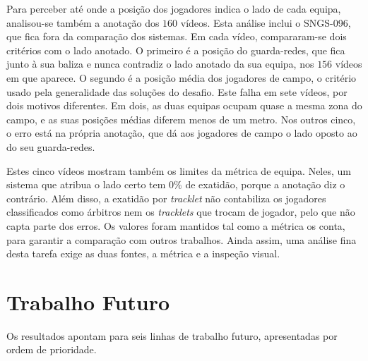 Para perceber até onde a posição dos jogadores indica o lado de cada equipa, analisou-se também a anotação dos $160$ vídeos. Esta análise inclui o SNGS-096, que fica fora da comparação dos sistemas. Em cada vídeo, compararam-se dois critérios com o lado anotado. O primeiro é a posição do guarda-redes, que fica junto à sua baliza e nunca contradiz o lado anotado da sua equipa, nos $156$ vídeos em que aparece. O segundo é a posição média dos jogadores de campo, o critério usado pela generalidade das soluções do desafio. Este falha em sete vídeos, por dois motivos diferentes. Em dois, as duas equipas ocupam quase a mesma zona do campo, e as suas posições médias diferem menos de um metro. Nos outros cinco, o erro está na própria anotação, que dá aos jogadores de campo o lado oposto ao do seu guarda-redes.

Estes cinco vídeos mostram também os limites da métrica de equipa. Neles, um sistema que atribua o lado certo tem $0\%$ de exatidão, porque a anotação diz o contrário. Além disso, a exatidão por \emph{tracklet} não contabiliza os jogadores classificados como árbitros nem os \emph{tracklets} que trocam de jogador, pelo que não capta parte dos erros. Os valores foram mantidos tal como a métrica os conta, para garantir a comparação com outros trabalhos. Ainda assim, uma análise fina desta tarefa exige as duas fontes, a métrica e a inspeção visual.

\section{Trabalho Futuro}\label{sec:trabalho_futuro}

Os resultados apontam para seis linhas de trabalho futuro, apresentadas por ordem de prioridade.

